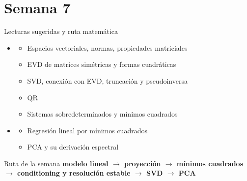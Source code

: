 \part{Semana 7}


\begin{frame}
  \titlepage
\end{frame}

\begin{frame}{Lecturas sugeridas y ruta matemática}
\begin{itemize}\small
  \item {}
  \begin{itemize}\footnotesize
    \item {} Espacios vectoriales, normas, propiedades matriciales
    \item {} EVD de matrices simétricas y formas cuadráticas
    \item {} SVD, conexión con EVD, truncación y pseudoinversa
    \item {} QR
    \item {} Sistemas sobredeterminados y mínimos cuadrados
  \end{itemize}
  \item {}
  \begin{itemize}\footnotesize
    \item {} Regresión lineal por mínimos cuadrados
    \item {} PCA y su derivación espectral
  \end{itemize}
\end{itemize}
\vspace{0.3em}
\begin{block}{Ruta de la semana}
\centering
\textbf{modelo lineal $\rightarrow$ proyección $\rightarrow$ mínimos cuadrados $\rightarrow$ conditioning y resolución estable $\rightarrow$ SVD $\rightarrow$ PCA}
\end{block}
\end{frame}

